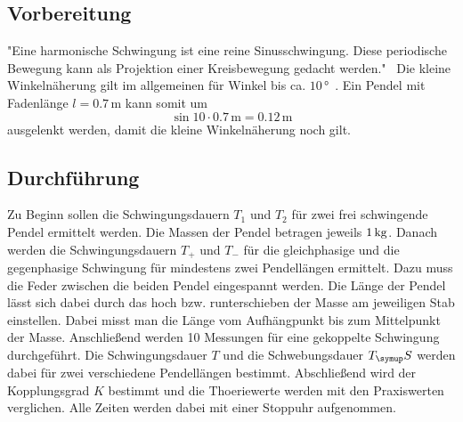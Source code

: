 \subsection{Vorbereitung}
"Eine harmonische Schwingung ist eine reine Sinusschwingung.
Diese periodische Bewegung kann als Projektion einer Kreisbewegung gedacht werden."
\,\cite{frankfurt}
Die kleine Winkelnäherung gilt im allgemeinen für Winkel bis ca. $10 \,\si{\degree}$ \,\cite{darmstadt}.
Ein Pendel mit Fadenlänge $l=0.7 \,\si{\meter}$ kann somit um
\begin{equation}
  \sin{10} \cdot 0.7 \,\si{\meter} = 0.12 \,\si{\meter}
\end{equation}
ausgelenkt werden, damit die kleine Winkelnäherung noch gilt.

\subsection{Durchführung}
Zu Beginn sollen die Schwingungsdauern $T_1$ und $T_2$ für zwei frei schwingende
Pendel ermittelt werden. Die Massen der Pendel betragen jeweils $1 \,\si{\kilo\gram}$.
Danach werden die Schwingungsdauern $T_+$ und $T_-$ für die gleichphasige und die
gegenphasige Schwingung für mindestens zwei Pendellängen ermittelt. Dazu muss die Feder
zwischen die beiden Pendel eingespannt werden.
Die Länge der Pendel lässt sich dabei durch das hoch bzw. runterschieben der Masse
am jeweiligen Stab einstellen. Dabei misst man die Länge vom Aufhängpunkt bis zum
Mittelpunkt der Masse. Anschließend werden 10 Messungen für eine gekoppelte Schwingung
durchgeführt. Die Schwingungsdauer $T$ und die Schwebungsdauer $T_\su{S}$ werden dabei
für zwei verschiedene Pendellängen bestimmt. Abschließend wird der Kopplungsgrad $K$
bestimmt und die Thoeriewerte werden mit den Praxiswerten verglichen. Alle Zeiten werden
dabei mit einer Stoppuhr aufgenommen.
